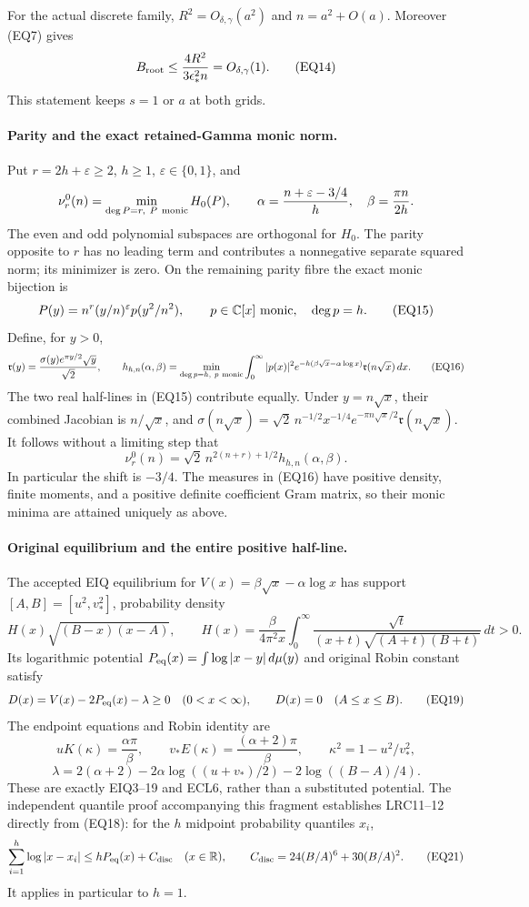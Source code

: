 For the actual discrete family,
\(R^2=O_{\delta,\gamma}(a^2)\) and \(n=a^2+O(a)\).  Moreover (EQ7) gives
\[
 B_{\rm root}\le\frac{4R^2}{3\epsilon_*^2n}
       =O_{\delta,\gamma}(1).
\tag{EQ14}
\]
This statement keeps \(s=1\) or \(a\) at both grids.

\paragraph{Parity and the exact retained-Gamma monic norm.}
Put \(r=2h+\varepsilon\ge2\), \(h\ge1\), \(\varepsilon\in\{0,1\}\), and
\[
 \nu_r^0(n)=\min_{\deg P=r,\ P\ {\rm monic}}H_0(P),\qquad
 \alpha=\frac{n+\varepsilon-3/4}{h},\quad
 \beta=\frac{\pi n}{2h}.
\]
The even and odd polynomial subspaces are orthogonal for \(H_0\).
The parity opposite to \(r\) has no leading term and contributes a
nonnegative separate squared norm; its minimizer is zero.  On the
remaining parity fibre the exact monic bijection is
\[
 P(y)=n^r(y/n)^\varepsilon p(y^2/n^2),\qquad
 p\in\mathbb C[x]\ {\rm monic},\quad\deg p=h.
\tag{EQ15}
\]
Define, for \(y>0\),
\[
 {\mathfrak r}(y)=\frac{\sigma(y)e^{\pi y/2}\sqrt y}{\sqrt2},\qquad
 h_{h,n}(\alpha,\beta)
 =\min_{\deg p=h,\ p\ {\rm monic}}
   \int_0^\infty |p(x)|^2 e^{-h(\beta\sqrt x-\alpha\log x)}
                         {\mathfrak r}(n\sqrt x)\,dx.
\tag{EQ16}
\]
The two real half-lines in (EQ15) contribute equally.  Under
\(y=n\sqrt x\), their combined Jacobian is \(n/\sqrt x\), and
\(\sigma(n\sqrt x)=\sqrt2\,n^{-1/2}x^{-1/4}
e^{-\pi n\sqrt x/2}{\mathfrak r}(n\sqrt x)\).
It follows without a limiting step that
\[
 \boxed{\nu_r^0(n)=\sqrt2\,n^{2(n+r)+1/2}
                 h_{h,n}(\alpha,\beta).}
\tag{EQ17}
\]
In particular the shift is \(-3/4\).  The measures in (EQ16) have positive
density, finite moments, and a positive definite coefficient Gram matrix,
so their monic minima are attained uniquely as above.

\paragraph{Original equilibrium and the entire positive half-line.}
The accepted EIQ equilibrium for
\(V(x)=\beta\sqrt x-\alpha\log x\) has support
\([A,B]=[u^2,v_*^2]\), probability density
\[
 H(x)\sqrt{(B-x)(x-A)},\qquad
 H(x)=\frac{\beta}{4\pi^2x}
   \int_0^\infty
   \frac{\sqrt t}{(x+t)\sqrt{(A+t)(B+t)}}\,dt>0.
\tag{EQ18}
\]
Its logarithmic potential \(P_{\rm eq}(x)=\int\log|x-y|\,d\mu(y)\)
and original Robin constant satisfy
\[
 D(x)=V(x)-2P_{\rm eq}(x)-\lambda\ge0\quad(0<x<\infty),
 \qquad D(x)=0\quad(A\le x\le B).
\tag{EQ19}
\]
The endpoint equations and Robin identity are
\[
 uK(\kappa)=\frac{\alpha\pi}{\beta},\qquad
 v_*E(\kappa)=\frac{(\alpha+2)\pi}{\beta},\qquad
 \kappa^2=1-u^2/v_*^2,
\]
\[
 \lambda=2(\alpha+2)-2\alpha\log((u+v_*)/2)
                   -2\log((B-A)/4).
\tag{EQ20}
\]
These are exactly EIQ3--19 and ECL6, rather than a substituted potential.
The independent quantile proof accompanying this fragment establishes
LRC11--12 directly from (EQ18):
for the \(h\) midpoint probability quantiles \(x_i\),
\[
 \sum_{i=1}^h\log|x-x_i|
 \le hP_{\rm eq}(x)+C_{\rm disc}\quad(x\in\mathbb R),\qquad
 C_{\rm disc}=24(B/A)^6+30(B/A)^2.
\tag{EQ21}
\]
It applies in particular to \(h=1\).

